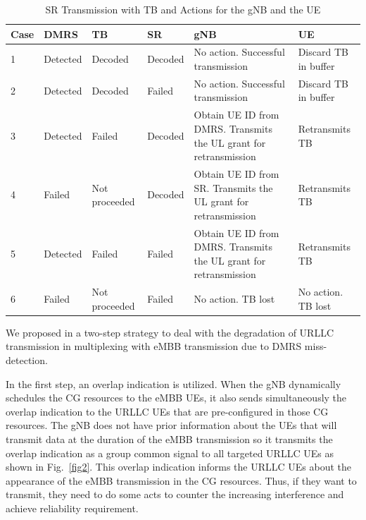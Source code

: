 \documentclass{ieeeaccess}
\begin{document}
\begin{table}[htbp]
\caption{SR Transmission with TB and Actions for the gNB and the UE}
\begin{center}
\begin{tabular}{|p{1.5em}|p{6em}|p{6em}|p{6em}|p{14em}|p{10em}|}
 \hline
 \textbf{Case} & \textbf{DMRS} & \textbf{TB} & \textbf{SR} & \textbf{gNB} & \textbf{UE}\\ 
 \hline
 1 & Detected & Decoded & Decoded & No action. Successful transmission & Discard TB in buffer\\
 \hline
 2 &  Detected & Decoded & Failed & No action. Successful transmission & Discard TB in buffer\\
\hline
3 & Detected & Failed & Decoded & Obtain UE ID from DMRS. Transmits the UL grant for retransmission & Retransmits TB\\
\hline
4 & Failed & Not proceeded & Decoded & Obtain UE ID from SR. Transmits the UL grant for retransmission & Retransmits TB\\
\hline
5 & Detected & Failed & Failed &  Obtain UE ID from DMRS. Transmits the UL grant for retransmission & Retransmits TB\\
\hline
 6 & Failed & Not proceeded & Failed & No action. TB lost & No action. TB lost\\
 

 
 \hline
\end{tabular}
\label{tab2}
\end{center}

\end{table}

We proposed in \cite{ad99} a two-step strategy to deal with the degradation of URLLC transmission in multiplexing with eMBB transmission due to DMRS miss-detection.

In the first step, an overlap indication is utilized. When the gNB dynamically schedules the CG resources to the eMBB UEs, it also sends simultaneously the overlap indication to the URLLC UEs that are pre-configured in those CG resources. The gNB does not have prior information about the UEs that will transmit data at the duration of the eMBB transmission so it transmits the overlap indication as a group common signal to all targeted URLLC UEs as shown in Fig.~\ref{fig2}. This overlap indication informs the URLLC UEs about the appearance of the eMBB transmission in the CG resources. Thus, if they want to transmit, they need to do some acts to counter the increasing interference and achieve reliability requirement.
\end{document}
